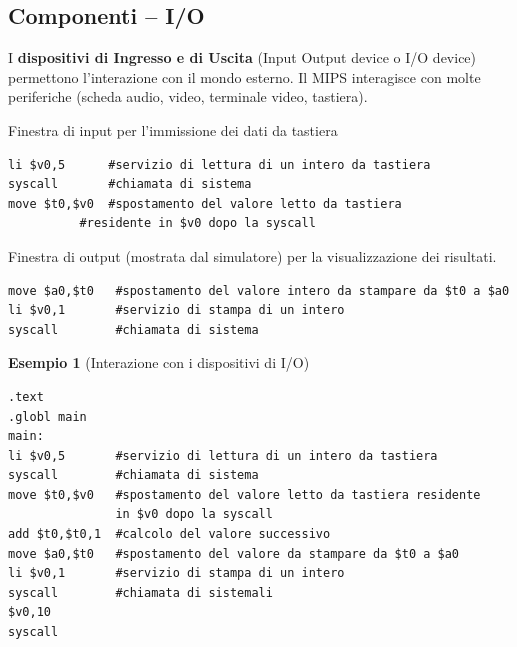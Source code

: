 \documentclass[12pt]{article} %
\begin{document}
\subsection{Componenti – I/O}
I \textbf{dispositivi di Ingresso e di Uscita} (Input Output device o I/O device) permettono l’interazione con il mondo esterno. Il MIPS interagisce con molte periferiche (scheda audio, video, terminale video, tastiera).\par\medskip\noindent
Finestra di input per l’immissione dei dati da tastiera 
\begin{lstlisting}
li $v0,5      #servizio di lettura di un intero da tastiera
syscall       #chiamata di sistema
move $t0,$v0  #spostamento del valore letto da tastiera
          #residente in $v0 dopo la syscall
\end{lstlisting}
\newpage
\noindent Finestra di output (mostrata dal simulatore) per la visualizzazione dei risultati.
\begin{lstlisting}
move $a0,$t0   #spostamento del valore intero da stampare da $t0 a $a0
li $v0,1       #servizio di stampa di un intero
syscall        #chiamata di sistema
\end{lstlisting}
\vspace{\baselineskip}
\textbf{Esempio 1} (Interazione con i dispositivi di I/O)
\begin{lstlisting}
.text
.globl main
main:
li $v0,5       #servizio di lettura di un intero da tastiera
syscall        #chiamata di sistema
move $t0,$v0   #spostamento del valore letto da tastiera residente 
               in $v0 dopo la syscall
add $t0,$t0,1  #calcolo del valore successivo
move $a0,$t0   #spostamento del valore da stampare da $t0 a $a0
li $v0,1       #servizio di stampa di un intero
syscall        #chiamata di sistemali
$v0,10
syscall
\end{lstlisting}
\vspace{\baselineskip}
\end{document}
